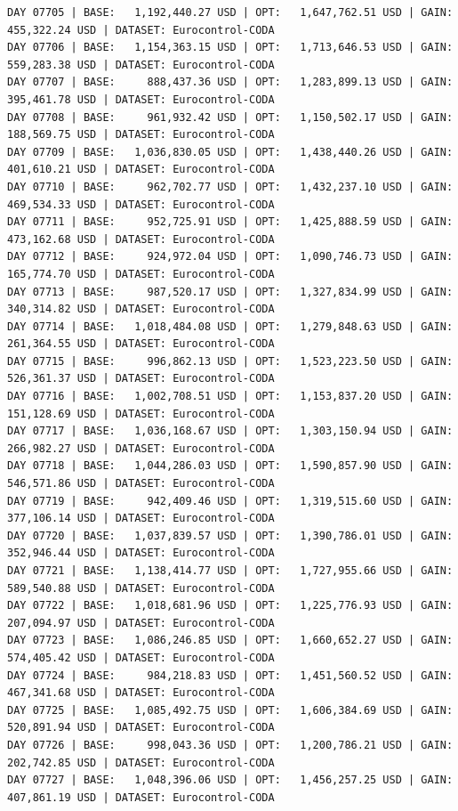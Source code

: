 \documentclass[11pt,a4paper]{article}
\begin{document}
\begin{verbatim}
DAY 07705 | BASE:   1,192,440.27 USD | OPT:   1,647,762.51 USD | GAIN: 455,322.24 USD | DATASET: Eurocontrol-CODA
DAY 07706 | BASE:   1,154,363.15 USD | OPT:   1,713,646.53 USD | GAIN: 559,283.38 USD | DATASET: Eurocontrol-CODA
DAY 07707 | BASE:     888,437.36 USD | OPT:   1,283,899.13 USD | GAIN: 395,461.78 USD | DATASET: Eurocontrol-CODA
DAY 07708 | BASE:     961,932.42 USD | OPT:   1,150,502.17 USD | GAIN: 188,569.75 USD | DATASET: Eurocontrol-CODA
DAY 07709 | BASE:   1,036,830.05 USD | OPT:   1,438,440.26 USD | GAIN: 401,610.21 USD | DATASET: Eurocontrol-CODA
DAY 07710 | BASE:     962,702.77 USD | OPT:   1,432,237.10 USD | GAIN: 469,534.33 USD | DATASET: Eurocontrol-CODA
DAY 07711 | BASE:     952,725.91 USD | OPT:   1,425,888.59 USD | GAIN: 473,162.68 USD | DATASET: Eurocontrol-CODA
DAY 07712 | BASE:     924,972.04 USD | OPT:   1,090,746.73 USD | GAIN: 165,774.70 USD | DATASET: Eurocontrol-CODA
DAY 07713 | BASE:     987,520.17 USD | OPT:   1,327,834.99 USD | GAIN: 340,314.82 USD | DATASET: Eurocontrol-CODA
DAY 07714 | BASE:   1,018,484.08 USD | OPT:   1,279,848.63 USD | GAIN: 261,364.55 USD | DATASET: Eurocontrol-CODA
DAY 07715 | BASE:     996,862.13 USD | OPT:   1,523,223.50 USD | GAIN: 526,361.37 USD | DATASET: Eurocontrol-CODA
DAY 07716 | BASE:   1,002,708.51 USD | OPT:   1,153,837.20 USD | GAIN: 151,128.69 USD | DATASET: Eurocontrol-CODA
DAY 07717 | BASE:   1,036,168.67 USD | OPT:   1,303,150.94 USD | GAIN: 266,982.27 USD | DATASET: Eurocontrol-CODA
DAY 07718 | BASE:   1,044,286.03 USD | OPT:   1,590,857.90 USD | GAIN: 546,571.86 USD | DATASET: Eurocontrol-CODA
DAY 07719 | BASE:     942,409.46 USD | OPT:   1,319,515.60 USD | GAIN: 377,106.14 USD | DATASET: Eurocontrol-CODA
DAY 07720 | BASE:   1,037,839.57 USD | OPT:   1,390,786.01 USD | GAIN: 352,946.44 USD | DATASET: Eurocontrol-CODA
DAY 07721 | BASE:   1,138,414.77 USD | OPT:   1,727,955.66 USD | GAIN: 589,540.88 USD | DATASET: Eurocontrol-CODA
DAY 07722 | BASE:   1,018,681.96 USD | OPT:   1,225,776.93 USD | GAIN: 207,094.97 USD | DATASET: Eurocontrol-CODA
DAY 07723 | BASE:   1,086,246.85 USD | OPT:   1,660,652.27 USD | GAIN: 574,405.42 USD | DATASET: Eurocontrol-CODA
DAY 07724 | BASE:     984,218.83 USD | OPT:   1,451,560.52 USD | GAIN: 467,341.68 USD | DATASET: Eurocontrol-CODA
DAY 07725 | BASE:   1,085,492.75 USD | OPT:   1,606,384.69 USD | GAIN: 520,891.94 USD | DATASET: Eurocontrol-CODA
DAY 07726 | BASE:     998,043.36 USD | OPT:   1,200,786.21 USD | GAIN: 202,742.85 USD | DATASET: Eurocontrol-CODA
DAY 07727 | BASE:   1,048,396.06 USD | OPT:   1,456,257.25 USD | GAIN: 407,861.19 USD | DATASET: Eurocontrol-CODA

\end{verbatim}
\end{document}
